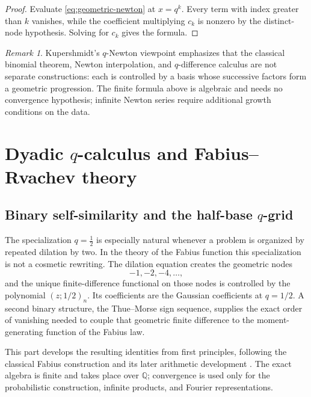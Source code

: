 \documentclass[11pt,oneside,openany]{book}
\theoremstyle{definition}
\theoremstyle{remark}
\newtheorem{remark}[theorem]{Remark}
\newcommand{\Q}{\mathbb Q}
\begin{document}
\begin{proof}
Evaluate \eqref{eq:geometric-newton} at $x=q^k$.  Every term with index greater than $k$ vanishes, while the coefficient multiplying $c_k$ is nonzero by the distinct-node hypothesis.  Solving for $c_k$ gives the formula.
\end{proof}

\begin{remark}
Kupershmidt's $q$-Newton viewpoint emphasizes that the classical binomial theorem, Newton interpolation, and $q$-difference calculus are not separate constructions: each is controlled by a basis whose successive factors form a geometric progression.  The finite formula above is algebraic and needs no convergence hypothesis; infinite Newton series require additional growth conditions on the data.
\end{remark}

\part{Dyadic \texorpdfstring{$q$}{q}-calculus and Fabius--Rvachev theory}

\chapter{Binary self-similarity and the half-base \texorpdfstring{$q$}{q}-grid}\label{chap:fabius-half}

The specialization $q=\tfrac12$ is especially natural whenever a problem is organized by repeated dilation by two.  In the theory of the Fabius function this specialization is not a cosmetic rewriting.  The dilation equation creates the geometric nodes
\[
 -1,-2,-4,\ldots,
\]
and the unique finite-difference functional on those nodes is controlled by the polynomial $(z;1/2)_n$.  Its coefficients are the Gaussian coefficients at $q=1/2$.  A second binary structure, the Thue--Morse sign sequence, supplies the exact order of vanishing needed to couple that geometric finite difference to the moment-generating function of the Fabius law.

This part develops the resulting identities from first principles, following the classical Fabius construction and its later arithmetic development \cite{Fabius1966,AriasDefinition,AriasArithmetic,ReshetnikovProveIt2026}.  The exact algebra is finite and takes place over $\Q$; convergence is used only for the probabilistic construction, infinite products, and Fourier representations.
\end{document}
